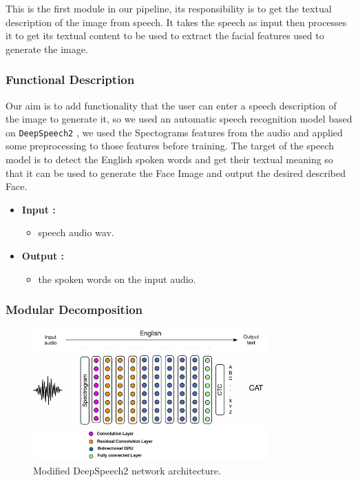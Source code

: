 This is the first module in our pipeline, its responsibility is to get the textual description of the image from speech. It takes the speech as input then processes it to get its textual content to be used to extract the facial features used to generate the image.

\subsubsection{Functional Description}

Our aim is to add functionality that the user can enter a speech description of the image to generate it, so we used an automatic speech recognition model based on \texttt{DeepSpeech2} \cite{amodei2015deep}, we used the Spectograms features from the audio and applied some preprocessing to those features before training. The target of the speech model is to detect the English spoken words and get their textual meaning so that it can be used to generate the Face Image and output the desired described Face.

\begin{itemize}
    \item \textbf{Input :}
    \begin{itemize}
        \item speech audio wav.
    \end{itemize}
    \item \textbf{Output :}
    \begin{itemize}
        \item the spoken words on the input audio.
    \end{itemize}
\end{itemize}

\subsubsection{Modular Decomposition}

\begin{figure}[H]
    \centering
    \includegraphics[width=0.8\textwidth]{images/speech.png}
    \caption{Modified DeepSpeech2 network architecture.}
    \label{fig:speechModel}
\end{figure}

